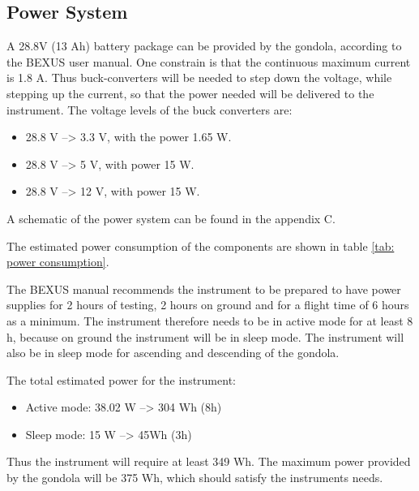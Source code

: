 \pagebreak
\subsection{Power System}

\label{sec:4.7}

A 28.8V (13 Ah) battery package can be provided by the gondola, according to the BEXUS user manual. One constrain is that the continuous maximum current is 1.8 A. Thus buck-converters will be needed to step down the voltage, while stepping up the current, so that the power needed will be delivered to the instrument. The voltage levels of the buck converters are: 

\begin{itemize}
	\item 28.8 V --> 3.3 V, with the power 1.65 W.
	\item 28.8 V --> 5 V, with power 15 W.
	\item 28.8 V --> 12 V, with power 15 W.
\end{itemize}

A schematic of the power system can be found in the appendix C.

The estimated power consumption of the components are shown in table \ref{tab: power consumption}. 



\newpage

The BEXUS manual recommends the instrument to be prepared to have power supplies for 2 hours of testing, 2 hours on ground and for a flight time of 6 hours as a minimum. The instrument therefore needs to be in active mode for at least 8 h, because on ground the instrument will be in sleep mode. The instrument will also be in sleep mode for ascending and descending of the gondola. 

The total estimated power for the instrument:

\begin{itemize}
    \item Active mode: 38.02 W  --> 304 Wh (8h)
    \item Sleep mode: 15 W --> 45Wh (3h) 
\end{itemize}

Thus the instrument will require at least 349 Wh. The maximum power provided by the gondola will be 375 Wh, which should satisfy the instruments needs.


\raggedbottom
